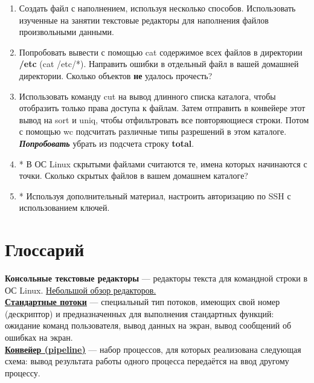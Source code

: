 \documentclass[14pt, a4paper]{article}
\begin{document}
\begin{enumerate}
    \item Создать файл с наполнением, используя несколько способов. Использовать изученные на
    занятии текстовые редакторы для наполнения файлов произвольными данными.
    \item Попробовать вывести с помощью cat содержимое всех файлов в директории \textbf{/etc} (cat /etc/*).
    Направить ошибки в отдельный файл в вашей домашней директории. Сколько объектов \textbf{не}
    удалось прочесть?
    \item Использовать команду cut на вывод длинного списка каталога, чтобы отобразить только права
    доступа к файлам. Затем отправить в конвейере этот вывод на sort и uniq, чтобы
    отфильтровать все повторяющиеся строки. Потом с помощью wc подсчитать различные типы
    разрешений в этом каталоге. \textbf{\textit{Попробовать}} убрать из подсчета строку \textbf{total}.
    \item * В ОС Linux скрытыми файлами считаются те, имена которых начинаются с точки. Сколько
    скрытых файлов в вашем домашнем каталоге?
    \item * Используя дополнительный материал, настроить авторизацию по SSH с использованием
    ключей.
\end{enumerate}

\section*{Глоссарий} 

\textbf{Консольные текстовые редакторы} — редакторы текста для командной строки в ОС Linux.
\href{https://losst.ru/luchshie-tekstovye-redaktory-linux}{Небольшой обзор редакторов.}\\

\href{https://ru.wikipedia.org/wiki/Стандартные_потоки}{\underline{\textbf{Стандартные потоки}}} — специальный тип потоков, имеющих свой номер (дескриптор) и
предназначенных для выполнения стандартных функций: ожидание команд пользователя, вывод
данных на экран, вывод сообщений об ошибках на экран.\\

\href{https://ru.wikipedia.org/wiki/Конвейер_(Unix)}{\underline{\textbf{Конвейер (pipeline)}}} — набор процессов, для которых реализована следующая схема: вывод
результата работы одного процесса передаётся на ввод другому процессу.\\
\end{document}
